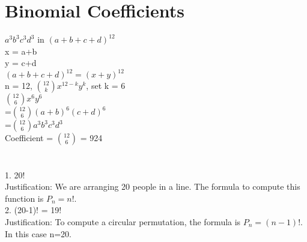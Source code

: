\documentclass{article}
\begin{document}
    \section{Binomial Coefficients}
$a^3b^3c^3d^3$ in $(a+b+c+d)^{12}$\\
x = a+b\\
y = c+d\\
$(a+b+c+d)^{12} = (x+y)^{12}$\\
n = 12, ${12 \choose k}x^{12-k}y^k$, set k = 6\\
${12 \choose 6}x^6y^6$\\
=${12 \choose 6}(a+b)^6(c+d)^6$\\    
=${12 \choose 6}a^3b^3c^3d^3$\\
Coefficient = ${12 \choose 6}$ = 924

    \newpage
    \section{}
1. 20!\\
Justification: We are arranging 20 people in a line. The formula to compute this function is $P_n = n!$.\\
2. (20-1)! = 19!\\
Justification: To compute a circular permutation, the formula is $P_n = (n-1)!$. In this case n=20.
        
  
   
\end{document}
